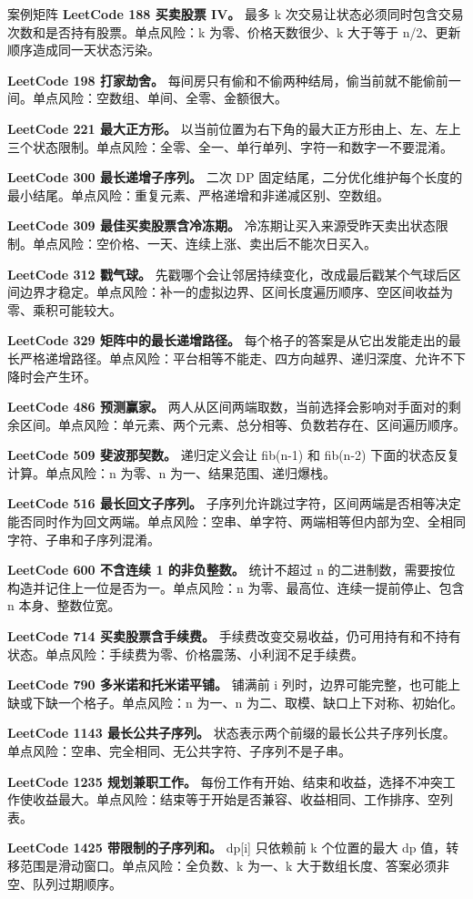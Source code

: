 \begin{principlebox}{案例矩阵}
\textbf{LeetCode 188 买卖股票 IV。}
最多 k 次交易让状态必须同时包含交易次数和是否持有股票。单点风险：k 为零、价格天数很少、k 大于等于 n/2、更新顺序造成同一天状态污染。

\textbf{LeetCode 198 打家劫舍。}
每间房只有偷和不偷两种结局，偷当前就不能偷前一间。单点风险：空数组、单间、全零、金额很大。

\textbf{LeetCode 221 最大正方形。}
以当前位置为右下角的最大正方形由上、左、左上三个状态限制。单点风险：全零、全一、单行单列、字符一和数字一不要混淆。

\textbf{LeetCode 300 最长递增子序列。}
二次 DP 固定结尾，二分优化维护每个长度的最小结尾。单点风险：重复元素、严格递增和非递减区别、空数组。

\textbf{LeetCode 309 最佳买卖股票含冷冻期。}
冷冻期让买入来源受昨天卖出状态限制。单点风险：空价格、一天、连续上涨、卖出后不能次日买入。

\textbf{LeetCode 312 戳气球。}
先戳哪个会让邻居持续变化，改成最后戳某个气球后区间边界才稳定。单点风险：补一的虚拟边界、区间长度遍历顺序、空区间收益为零、乘积可能较大。

\textbf{LeetCode 329 矩阵中的最长递增路径。}
每个格子的答案是从它出发能走出的最长严格递增路径。单点风险：平台相等不能走、四方向越界、递归深度、允许不下降时会产生环。

\textbf{LeetCode 486 预测赢家。}
两人从区间两端取数，当前选择会影响对手面对的剩余区间。单点风险：单元素、两个元素、总分相等、负数若存在、区间遍历顺序。

\textbf{LeetCode 509 斐波那契数。}
递归定义会让 fib(n-1) 和 fib(n-2) 下面的状态反复计算。单点风险：n 为零、n 为一、结果范围、递归爆栈。

\textbf{LeetCode 516 最长回文子序列。}
子序列允许跳过字符，区间两端是否相等决定能否同时作为回文两端。单点风险：空串、单字符、两端相等但内部为空、全相同字符、子串和子序列混淆。

\textbf{LeetCode 600 不含连续 1 的非负整数。}
统计不超过 n 的二进制数，需要按位构造并记住上一位是否为一。单点风险：n 为零、最高位、连续一提前停止、包含 n 本身、整数位宽。

\textbf{LeetCode 714 买卖股票含手续费。}
手续费改变交易收益，仍可用持有和不持有状态。单点风险：手续费为零、价格震荡、小利润不足手续费。

\textbf{LeetCode 790 多米诺和托米诺平铺。}
铺满前 i 列时，边界可能完整，也可能上缺或下缺一个格子。单点风险：n 为一、n 为二、取模、缺口上下对称、初始化。

\textbf{LeetCode 1143 最长公共子序列。}
状态表示两个前缀的最长公共子序列长度。单点风险：空串、完全相同、无公共字符、子序列不是子串。

\textbf{LeetCode 1235 规划兼职工作。}
每份工作有开始、结束和收益，选择不冲突工作使收益最大。单点风险：结束等于开始是否兼容、收益相同、工作排序、空列表。

\textbf{LeetCode 1425 带限制的子序列和。}
dp[i] 只依赖前 k 个位置的最大 dp 值，转移范围是滑动窗口。单点风险：全负数、k 为一、k 大于数组长度、答案必须非空、队列过期顺序。

\end{principlebox}

